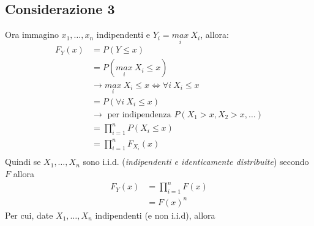 \documentclass[11pt]{report}
\begin{document}
\subsection{Considerazione 3}
Ora immagino $x_1, \dots, x_n$ indipendenti e $Y_i = \underset{i}{max}\ X_i$, allora:
\begin{equation}
    \begin{split}
        F_Y(x) & = P(Y \leq x)\\
        & = P(\underset{i}{max}\ X_i \leq x)\\
        & \rightarrow \underset{i}{max}\ X_i \leq x \iff \forall i\ X_i \leq x\\
        & = P(\forall i\ X_i \leq x)\\
        & \rightarrow \text{ per indipendenza } P(X_1>x, X_2>x, \dots)\\
        & = \prod_{i=1}^n P(X_i \leq x)\\
        & = \prod_{i=1}^n F_{X_i}(x)\\
    \end{split}
\end{equation}
Quindi se $X_1, \dots, X_n$ sono i.i.d. (\textit{indipendenti e identicamente distribuite}) secondo $F$ allora
\begin{equation}
    \begin{split}
        F_Y(x) & = \prod_{i=1}^n F(x)\\
        & = F(x)^n
    \end{split}
\end{equation}
Per cui, date $X_1, \dots, X_n$ indipendenti (e non i.i.d), allora
\end{document}
